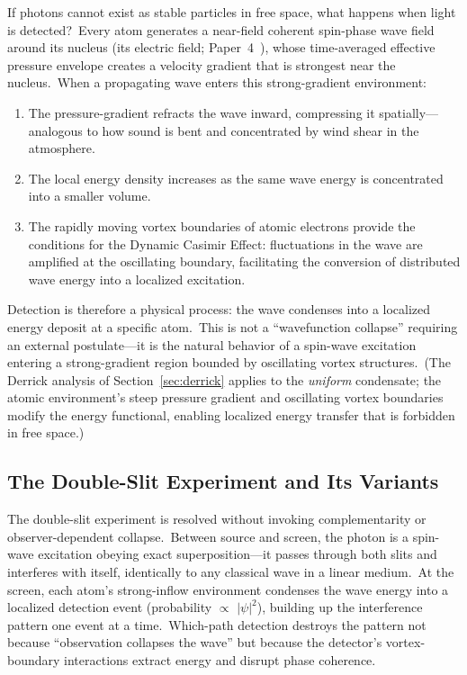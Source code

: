 ﻿\documentclass[12pt,letterpaper]{article}
\begin{document}
If photons cannot exist as stable particles in free space, what happens when light is
detected?\ Every atom generates a near-field coherent spin-phase wave field
around its nucleus (its electric field;
Paper~4~\cite{otto-em}), whose time-averaged effective pressure envelope
creates a velocity gradient that is strongest near the nucleus.\ When a propagating wave
enters this strong-gradient environment:
%
\begin{enumerate}[leftmargin=2em]
  \item The pressure-gradient refracts the wave inward, compressing it spatially---analogous
    to how sound is bent and concentrated by wind shear in the atmosphere.
  \item The local energy density increases as the same wave energy is concentrated into a
    smaller volume.
  \item The rapidly moving vortex boundaries of atomic electrons provide the conditions for
    the Dynamic Casimir Effect: fluctuations in the wave are amplified at the oscillating
    boundary, facilitating the conversion of distributed wave energy into a localized
    excitation.
\end{enumerate}
%
Detection is therefore a physical process: the wave condenses into a localized energy
deposit at a specific atom.\ This is not a ``wavefunction collapse'' requiring an
external postulate---it is the natural behavior of a spin-wave excitation entering a
strong-gradient region bounded by oscillating vortex structures.\ (The Derrick analysis
of Section~\ref{sec:derrick} applies to the \emph{uniform} condensate; the atomic
environment's steep pressure gradient and oscillating vortex boundaries modify the
energy functional, enabling localized energy transfer that is forbidden in free space.)

\subsection{The Double-Slit Experiment and Its Variants}

The double-slit experiment is resolved without invoking complementarity or
observer-dependent collapse.\ Between source and screen, the photon is a
spin-wave excitation obeying exact superposition---it passes through both
slits and interferes with itself, identically to any classical wave in a
linear medium.\ At the screen, each atom's strong-inflow environment condenses
the wave energy into a localized detection event (probability $\propto$
$|\psi|^2$), building up the interference pattern one event at a time.\
Which-path detection destroys the pattern not because ``observation collapses
the wave'' but because the detector's vortex-boundary interactions extract
energy and disrupt phase coherence.
\end{document}
